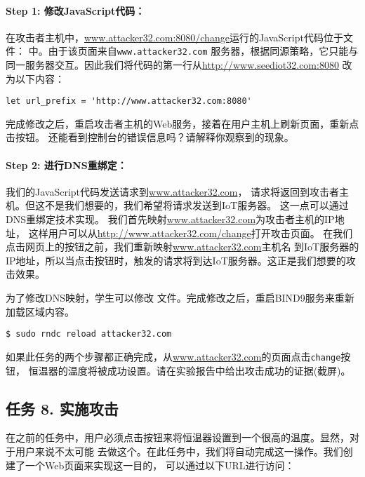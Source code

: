 \paragraph{Step 1: 修改JavaScript代码：}
在攻击者主机中，\url{www.attacker32.com:8080/change}运行的JavaScript代码位于文件：
中。由于该页面来自\texttt{www.attacker32.com}
服务器，根据同源策略，它只能与同一服务器交互。因此我们将代码的第一行从\url{http://www.seediot32.com:8080} 
改为以下内容：

\begin{lstlisting}
let url_prefix = 'http://www.attacker32.com:8080'
\end{lstlisting}
 

完成修改之后，重启攻击者主机的Web服务，接着在用户主机上刷新页面，重新点击按钮。
还能看到控制台的错误信息吗？请解释你观察到的现象。




\paragraph{Step 2: 进行DNS重绑定：}
我们的JavaScript代码发送请求到\url{www.attacker32.com}，
请求将返回到攻击者主机。但这不是我们想要的，我们希望将请求发送到IoT服务器。
这一点可以通过DNS重绑定技术实现。
我们首先映射\url{www.attacker32.com}为攻击者主机的IP地址，
这样用户可以从\url{http://www.attacker32.com/change}打开攻击页面。
在我们点击网页上的按钮之前，我们重新映射\url{www.attacker32.com}主机名
到IoT服务器的IP地址，所以当点击按钮时，触发的请求将到达IoT服务器。这正是我们想要的攻击效果。


为了修改DNS映射，学生可以修改
文件。完成修改之后，重启BIND9服务来重新加载区域内容。


\begin{lstlisting}
$ sudo rndc reload attacker32.com
\end{lstlisting}
 

如果此任务的两个步骤都正确完成，从\url{www.attacker32.com}的页面点击\texttt{change}按钮，
恒温器的温度将被成功设置。请在实验报告中给出攻击成功的证据(截屏)。



\subsection{任务 8. 实施攻击}

在之前的任务中，用户必须点击按钮来将恒温器设置到一个很高的温度。显然，对于用户来说不太可能
去做这个。在此任务中，我们将自动完成这一操作。我们创建了一个Web页面来实现这一目的，
可以通过以下URL进行访问：



